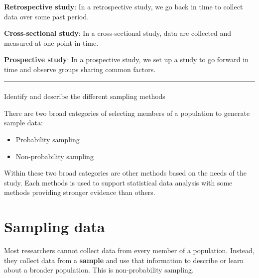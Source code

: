 \documentclass[
  letterpaper,
  DIV=11,
  numbers=noendperiod]{scrartcl}
\makeatletter
\let\oldparagraph\paragraph
\renewcommand{\paragraph}{
    \@ifstar
      \xxxParagraphStar
      \xxxParagraphNoStar
  }
\newcommand{\xxxParagraphStar}[1]{\oldparagraph*{#1}\mbox{}}
\newcommand{\xxxParagraphNoStar}[1]{\oldparagraph{#1}\mbox{}}
\makeatother
\begin{document}
\begin{tcolorbox}[enhanced jigsaw, opacityback=0, opacitybacktitle=0.6, coltitle=black, title={\textbf{DEFINITIONS}: Types of studies}, colback=white, arc=.35mm, breakable, bottomtitle=1mm, colbacktitle=quarto-callout-caution-color!10!white, toptitle=1mm, colframe=quarto-callout-caution-color-frame, titlerule=0mm, rightrule=.15mm, bottomrule=.15mm, toprule=.15mm, leftrule=.75mm, left=2mm]

\textbf{Retrospective study}: In a retrospective study, we go back in
time to collect data over some past period.

\textbf{Cross-sectional study}: In a cross-sectional study, data are
collected and measured at one point in time.

\textbf{Prospective study}: In a prospective study, we set up a study to
go forward in time and observe groups sharing common factors.

\end{tcolorbox}

\begin{center}\rule{0.5\linewidth}{0.5pt}\end{center}

\paragraph{Identify and describe the different sampling
methods}\label{identify-and-describe-the-different-sampling-methods}

There are two broad categories of selecting members of a population to
generate sample data:

\begin{itemize}
\item
  Probability sampling
\item
  Non-probability sampling
\end{itemize}

Within these two broad categories are other methods based on the needs
of the study. Each methods is used to support statistical data analysis
with some methods providing stronger evidence than others.

\section{Sampling data}\label{sampling-data}

Most researchers cannot collect data from every member of a population.
Instead, they collect data from a \textbf{sample} and use that
information to describe or learn about a broader population. This is
non-probability sampling.
\end{document}
